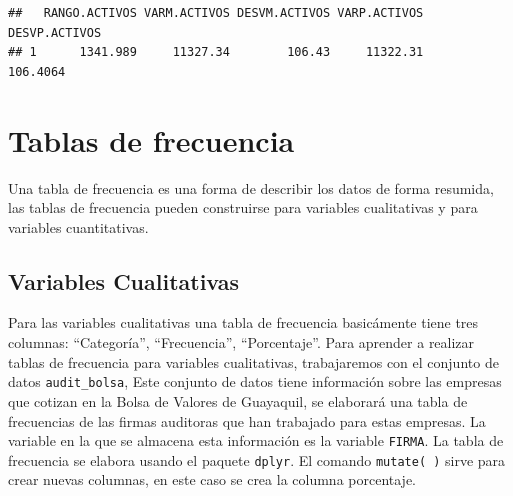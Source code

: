 \documentclass[]{book}
\newenvironment{Shaded}{\begin{snugshade}}{\end{snugshade}}
\newcommand{\KeywordTok}[1]{\textcolor[rgb]{0.13,0.29,0.53}{\textbf{#1}}}
\newcommand{\DataTypeTok}[1]{\textcolor[rgb]{0.13,0.29,0.53}{#1}}
\newcommand{\DecValTok}[1]{\textcolor[rgb]{0.00,0.00,0.81}{#1}}
\newcommand{\StringTok}[1]{\textcolor[rgb]{0.31,0.60,0.02}{#1}}
\newcommand{\OperatorTok}[1]{\textcolor[rgb]{0.81,0.36,0.00}{\textbf{#1}}}
\newcommand{\NormalTok}[1]{#1}
\begin{document}
\begin{Shaded}
\end{Shaded}

\begin{verbatim}
##   RANGO.ACTIVOS VARM.ACTIVOS DESVM.ACTIVOS VARP.ACTIVOS DESVP.ACTIVOS
## 1      1341.989     11327.34        106.43     11322.31      106.4064
\end{verbatim}

\section{Tablas de frecuencia}\label{tablas-de-frecuencia}

Una tabla de frecuencia es una forma de describir los datos de forma
resumida, las tablas de frecuencia pueden construirse para variables
cualitativas y para variables cuantitativas.

\subsection{Variables Cualitativas}\label{variables-cualitativas}

Para las variables cualitativas una tabla de frecuencia basicámente
tiene tres columnas: ``Categoría'', ``Frecuencia'', ``Porcentaje''. Para
aprender a realizar tablas de frecuencia para variables cualitativas,
trabajaremos con el conjunto de datos \texttt{audit\_bolsa}, Este
conjunto de datos tiene información sobre las empresas que cotizan en la
Bolsa de Valores de Guayaquil, se elaborará una tabla de frecuencias de
las firmas auditoras que han trabajado para estas empresas. La variable
en la que se almacena esta información es la variable \texttt{FIRMA}. La
tabla de frecuencia se elabora usando el paquete \texttt{dplyr}. El
comando \texttt{mutate(\ )} sirve para crear nuevas columnas, en este
caso se crea la columna porcentaje.
\end{document}
